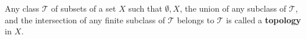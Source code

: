 Any class $\mathcal{T}$ of subsets of a set $X$ such that $\emptyset, X$, the union of any subclass of $\mathcal{T}$, and the intersection of any finite subclass of $\mathcal{T}$ belongs to $\mathcal{T}$ is called a \textbf{topology} in $X$.
